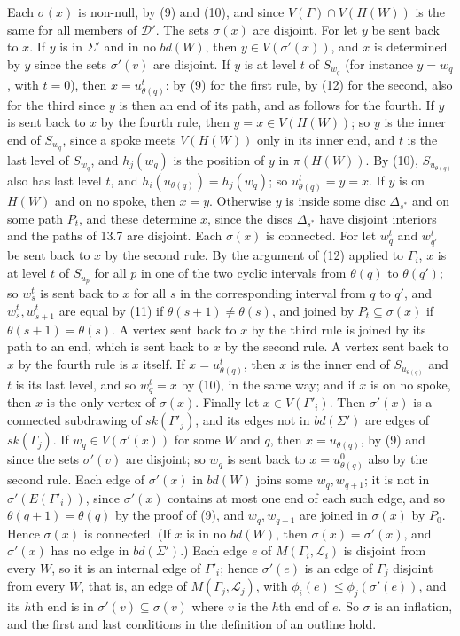 {Each $\sigma(x)$ is non-null, by (9) and (10), and since $V(\Gamma) \cap V(H(W))$ is the same for all members of $\mathscr{D}'$. The sets $\sigma(x)$ are disjoint. For let $y$ be sent back to $x$. If $y$ is in $\Sigma'$ and in no $bd(W)$, then $y \in V(\sigma'(x))$, and $x$ is determined by $y$ since the sets $\sigma'(v)$ are disjoint. If $y$ is at level $t$ of $S_{w_q}$ (for instance $y = w_q$, with $t = 0$), then $x = u^t_{\theta(q)}$: by (9) for the first rule, by (12) for the second, also for the third since $y$ is then an end of its path, and as follows for the fourth. If $y$ is sent back to $x$ by the fourth rule, then $y = x \in V(H(W))$; so $y$ is the inner end of $S_{w_q}$, since a spoke meets $V(H(W))$ only in its inner end, and $t$ is the last level of $S_{w_q}$, and $h_j(w_q)$ is the position of $y$ in $\pi(H(W))$. By (10), $S_{u_{\theta(q)}}$ also has last level $t$, and $h_i(u_{\theta(q)}) = h_j(w_q)$; so $u^t_{\theta(q)} = y = x$. If $y$ is on $H(W)$ and on no spoke, then $x = y$. Otherwise $y$ is inside some disc $\Delta_{s^*}$ and on some path $P_t$, and these determine $x$, since the discs $\Delta_{s^*}$ have disjoint interiors and the paths of 13.7 are disjoint. Each $\sigma(x)$ is connected. For let $w_q^t$ and $w_{q'}^t$ be sent back to $x$ by the second rule. By the argument of (12) applied to $\Gamma_i$, $x$ is at level $t$ of $S_{u_p}$ for all $p$ in one of the two cyclic intervals from $\theta(q)$ to $\theta(q')$; so $w_s^t$ is sent back to $x$ for all $s$ in the corresponding interval from $q$ to $q'$, and $w_s^t, w_{s+1}^t$ are equal by (11) if $\theta(s+1) \ne \theta(s)$, and joined by $P_t \subseteq \sigma(x)$ if $\theta(s+1) = \theta(s)$. A vertex sent back to $x$ by the third rule is joined by its path to an end, which is sent back to $x$ by the second rule. A vertex sent back to $x$ by the fourth rule is $x$ itself. If $x = u^t_{\theta(q)}$, then $x$ is the inner end of $S_{u_{\theta(q)}}$ and $t$ is its last level, and so $w_q^t = x$ by (10), in the same way; and if $x$ is on no spoke, then $x$ is the only vertex of $\sigma(x)$. Finally let $x \in V(\Gamma'_i)$. Then $\sigma'(x)$ is a connected subdrawing of $sk(\Gamma'_j)$, and its edges not in $bd(\Sigma')$ are edges of $sk(\Gamma_j)$. If $w_q \in V(\sigma'(x))$ for some $W$ and $q$, then $x = u_{\theta(q)}$, by (9) and since the sets $\sigma'(v)$ are disjoint; so $w_q$ is sent back to $x = u^0_{\theta(q)}$ also by the second rule. Each edge of $\sigma'(x)$ in $bd(W)$ joins some $w_q, w_{q+1}$; it is not in $\sigma'(E(\Gamma'_i))$, since $\sigma'(x)$ contains at most one end of each such edge, and so $\theta(q+1) = \theta(q)$ by the proof of (9), and $w_q, w_{q+1}$ are joined in $\sigma(x)$ by $P_0$. Hence $\sigma(x)$ is connected. (If $x$ is in no $bd(W)$, then $\sigma(x) = \sigma'(x)$, and $\sigma'(x)$ has no edge in $bd(\Sigma')$.) Each edge $e$ of $M(\Gamma_i, \mathscr{L}_i)$ is disjoint from every $W$, so it is an internal edge of $\Gamma'_i$; hence $\sigma'(e)$ is an edge of $\Gamma_j$ disjoint from every $W$, that is, an edge of $M(\Gamma_j, \mathscr{L}_j)$, with $\phi_i(e) \le \phi_j(\sigma'(e))$, and its $h$th end is in $\sigma'(v) \subseteq \sigma(v)$ where $v$ is the $h$th end of $e$. So $\sigma$ is an inflation, and the first and last conditions in the definition of an outline hold.

}
